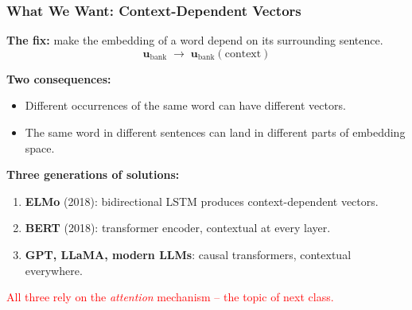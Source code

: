 \documentclass[notes,11pt, aspectratio=169]{beamer}
\newcommand{\vu}{\mathbf{u}}
\begin{document}
\begin{frame}
\frametitle{What We Want: Context-Dependent Vectors}

\textbf{The fix:} make the embedding of a word depend on its surrounding sentence.
\[
    \vu_{\text{bank}} \;\longrightarrow\; \vu_{\text{bank}}(\text{context})
\]

\vspace{8pt}
\textbf{Two consequences:}
\begin{itemize}
    \item Different occurrences of the same word can have different vectors.
    \item The same word in different sentences can land in different parts of embedding space.
\end{itemize}

\vspace{8pt}
\textbf{Three generations of solutions:}
\begin{enumerate}
    \item \textbf{ELMo} (2018): bidirectional LSTM produces context-dependent vectors.
    \item \textbf{BERT} (2018): transformer encoder, contextual at every layer.
    \item \textbf{GPT, LLaMA, modern LLMs}: causal transformers, contextual everywhere.
\end{enumerate}

\vspace{6pt}
\textcolor{red}{All three rely on the \emph{attention} mechanism -- the topic of next class.}
\end{frame}
\end{document}
